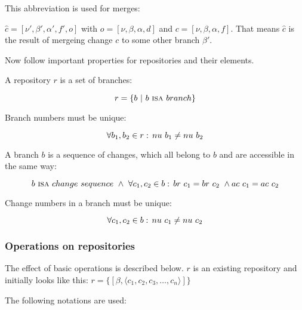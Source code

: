 \documentclass[fleqn, 10pt, a4paper]{article}
\begin{document}
This abbreviation is used for merges:

$\hat c = [\nu', \beta', \alpha', f', o]$ with $o=[\nu, \beta, \alpha, d]$ and
$c=[\nu, \beta, \alpha, f]$. That means $\hat c$ is the result of mergeing
change $c$ to some other branch $\beta'$.

Now follow important properties for repositories and their elements.

A repository $r$ is a set of branches:

\begin{displaymath}
r = \{b \ |\ b\ \mbox{\textsc{isa}}\ \mathnormal{branch}\}
\end{displaymath}

Branch numbers must be unique:

\begin{displaymath}
\forall b_1, b_2 \in r:\, \mathnormal{nu}\ b_1 \neq \mathnormal{nu}\ b_2
\end{displaymath}

A branch $b$ is a sequence of changes, which all belong to
$b$ and are accessible in the same way:

\begin{displaymath}
b\ \mbox{\textsc{isa}}\ \mathnormal{change}\ \mathnormal{sequence}\ \wedge\
\forall c_1, c_2 \in b:\, \mathnormal{br}\ c_1 = \mathnormal{br}\ c_2\ \wedge
\mathnormal{ac}\ c_1 = \mathnormal{ac}\ c_2
\end{displaymath}

Change numbers in a branch must be unique:

\begin{displaymath}
\forall c_1, c_2 \in b:\, \mathnormal{nu}\ c_1 \neq
\mathnormal{nu}\ c_2
\end{displaymath}

\subsubsection{Operations on repositories}

The effect of basic operations is described below. $r$ is an
existing repository and initially looks like this:
$r = \{[\beta, \langle c_1, c_2, c_3, \ldots, c_n\rangle]\}$

The following notations are used:
\end{document}
